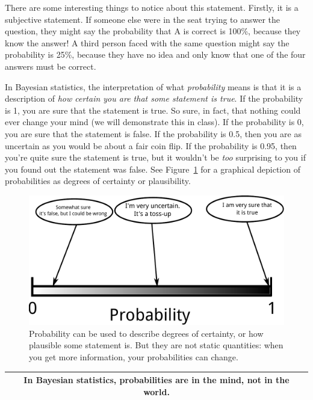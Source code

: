 There are some interesting
things to notice about this statement. Firstly, it is a subjective statement.
If someone else were in the seat trying to answer the question, they might say
the probability that A is correct is 100\%, because they know the answer!
A third person faced with the same question might say the probability is 25\%,
because they have no idea and only know that one of the four answers
must be correct.

In Bayesian statistics, the interpretation of what {\it probability} means is
that it is a description of {\it how certain you are that some statement is
true}.
If the probability is 1, you are sure that the statement is true. So sure, in
fact, that nothing could ever change your mind (we will demonstrate this in class).
If the probability is 0, you
are sure that the statement is false. If the probability is 0.5, then you
are as uncertain as you would be about a fair coin flip. If the probability is
0.95, then you're quite sure the statement is true, but it wouldn't be {\it too}
surprising to you if you found out the statement was false. See
Figure~\ref{fig:probability_scale} for a graphical depiction of probabilities
as degrees of certainty or plausibility.

\begin{figure}
\begin{center}
\includegraphics[scale=0.6]{Figures/probability_scale.pdf}
\caption{Probability can be used to describe degrees of certainty, or
how plausible some statement is. But they are not static quantities: when
you get more information, your probabilities can change.
\label{fig:probability_scale}}
\end{center}
\end{figure}

\begin{center}
\begin{tabular}{|c|}
\hline
{\bf In Bayesian statistics, probabilities are in the mind, not in the world.}\\
\hline
\end{tabular}
\end{center}

